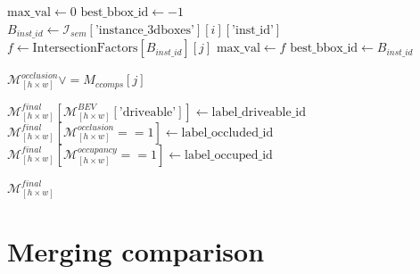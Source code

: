 \begin{algorithm}
\begin{algorithmic}[1]
             
                \State $\text{max\_val} \gets 0$
                \State $\text{best\_bbox\_id} \gets -1$
                    \State $B_{inst\_id} \gets \mathcal{I}_{sem}[\text{'instance\_3dboxes'}][i][\text{'inst\_id'}]$
                    \State $f \gets \text{IntersectionFactors}[B_{inst\_id}][j]$
                        \State $\text{max\_val} \gets f$
                        \State $\text{best\_bbox\_id} \gets B_{inst\_id}$
                    \EndIf
                \EndFor

                    \State $\mathcal{M}^{occlusion}_{\left[h \times w\right]} \lor = M_{ccomps}[j]$
                \EndIf
            \EndFor

        \EndFor
        
        \State $\mathcal{M}^{final}_{\left[h \times w\right]}[\mathcal{M}^{BEV}_{\left[h \times w\right]}[\text{'driveable'}]] \gets \text{label\_driveable\_id}$
        \State $\mathcal{M}^{final}_{\left[h \times w\right]}[\mathcal{M}^{occlusion}_{\left[h \times w\right]} == 1] \gets \text{label\_occluded\_id}$
        \State $\mathcal{M}^{final}_{\left[h \times w\right]}[\mathcal{M}^{occupancy}_{\left[h \times w\right]} == 1] \gets \text{label\_occuped\_id}$
        
        \State \Return $\mathcal{M}^{final}_{\left[h \times w\right]}$
    \end{algorithmic}
\end{algorithm}

\section{Merging comparison}


